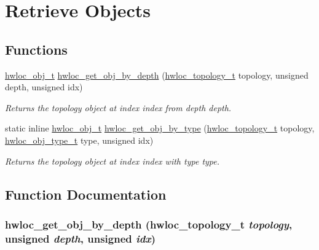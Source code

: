 \hypertarget{group__hwlocality__traversal}{
\section{Retrieve Objects}
\label{group__hwlocality__traversal}
}
\subsection*{Functions}
\begin{DoxyCompactItemize}
\item 
\hyperlink{structhwloc__obj}{hwloc\_\-obj\_\-t} \hyperlink{group__hwlocality__traversal_gabf8a98ad085460a4982cc7b74c344b71}{hwloc\_\-get\_\-obj\_\-by\_\-depth} (\hyperlink{group__hwlocality__topology_ga9d1e76ee15a7dee158b786c30b6a6e38}{hwloc\_\-topology\_\-t} topology, unsigned depth, unsigned idx)
\begin{DoxyCompactList}\small\item\em Returns the topology object at index {\ttfamily index} from depth {\ttfamily depth}. \item\end{DoxyCompactList}\item 
static inline \hyperlink{structhwloc__obj}{hwloc\_\-obj\_\-t} \hyperlink{group__hwlocality__traversal_ga718b83f189c970ad16b4ec068df18612}{hwloc\_\-get\_\-obj\_\-by\_\-type} (\hyperlink{group__hwlocality__topology_ga9d1e76ee15a7dee158b786c30b6a6e38}{hwloc\_\-topology\_\-t} topology, \hyperlink{group__hwlocality__types_gacd37bb612667dc437d66bfb175a8dc55}{hwloc\_\-obj\_\-type\_\-t} type, unsigned idx)
\begin{DoxyCompactList}\small\item\em Returns the topology object at index {\ttfamily index} with type {\ttfamily type}. \item\end{DoxyCompactList}\end{DoxyCompactItemize}


\subsection{Function Documentation}
\hypertarget{group__hwlocality__traversal_gabf8a98ad085460a4982cc7b74c344b71}{
\subsubsection[{hwloc\_\-get\_\-obj\_\-by\_\-depth}]{ hwloc\_\-get\_\-obj\_\-by\_\-depth ({\bf hwloc\_\-topology\_\-t} {\em topology}, \/  unsigned {\em depth}, \/  unsigned {\em idx})}}
\label{group__hwlocality__traversal_gabf8a98ad085460a4982cc7b74c344b71}


